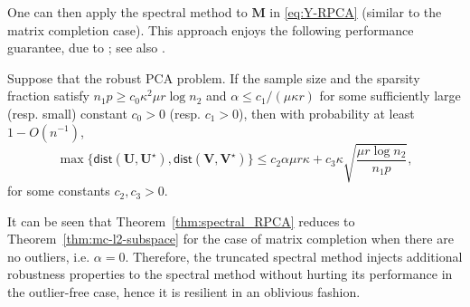 One can then apply the spectral method to $\bm{M}$ in \eqref{eq:Y-RPCA} (similar to the matrix completion case). This approach enjoys the following performance guarantee, due to \cite{yi2016fast}; see also \citep{cherapanamjeri2017nearly}.
%
\begin{theorem} \label{thm:spectral_RPCA}
Suppose that the robust PCA problem. If the sample size and the sparsity fraction satisfy $n_1  p\geq c_0  \kappa^2 \mu r  \log n_2$ and $\alpha\leq c_1/( \mu \kappa  r )$ for
	some sufficiently large (resp. small) constant $c_0>0$ (resp. $c_1>0$), then 
with probability at least $1-O\left(n^{-1}\right)$,  
%
	\[
  \max\Big\{ \mathsf{dist}\left(\bm{U},\bm{U}^{\star}\right),\mathsf{dist}\left(\bm{V},\bm{V}^{\star}\right) \Big\}  \leq  c_2 \alpha \mu r \kappa + c_3 \kappa \sqrt{\frac{\mu r \log n_2}{n_1 p}},
	\]	
for some constants $c_2, c_3>0$.
\end{theorem}

It can be seen that Theorem~\ref{thm:spectral_RPCA} reduces to Theorem~\ref{thm:mc-l2-subspace} for the case of matrix completion when there are no outliers, i.e. $\alpha =0$. Therefore, the truncated spectral method injects additional robustness properties to the spectral method without hurting its performance in the outlier-free case, hence it is resilient in an oblivious fashion.   


